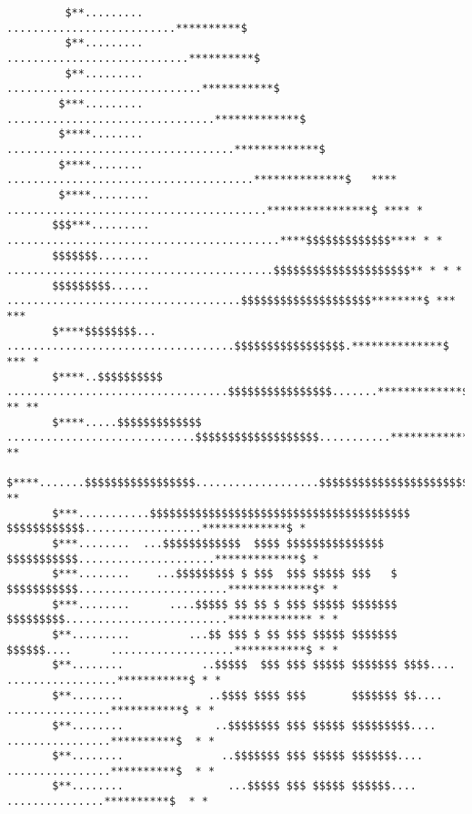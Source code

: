 \begin{verbatim}
         $**.........                                             ..........................**********$
         $**.........                                           ............................**********$
         $**.........                                         ..............................***********$
        $***.........                                      ................................*************$
        $****........                                   ...................................*************$
        $****........                                ......................................**************$   ****
        $****.........                            ........................................****************$ **** *
       $$$***.........                          ..........................................****$$$$$$$$$$$$$**** * *
       $$$$$$$........                        .........................................$$$$$$$$$$$$$$$$$$$$$** * * *
       $$$$$$$$$......                     ....................................$$$$$$$$$$$$$$$$$$$$********$ *** ***
       $****$$$$$$$$...                 ...................................$$$$$$$$$$$$$$$$$.**************$ *** *
       $****..$$$$$$$$$$             ..................................$$$$$$$$$$$$$$$$.......*************$ ** **
       $****.....$$$$$$$$$$$$$     .............................$$$$$$$$$$$$$$$$$$$...........**************$ **
       $****.......$$$$$$$$$$$$$$$$$...................$$$$$$$$$$$$$$$$$$$$$$$$...............**************$ **
       $***...........$$$$$$$$$$$$$$$$$$$$$$$$$$$$$$$$$$$$$$$$   $$$$$$$$$$$$..................*************$ *
       $***........  ...$$$$$$$$$$$$  $$$$ $$$$$$$$$$$$$$$     $$$$$$$$$$$.....................*************$ *
       $***........    ...$$$$$$$$$ $ $$$  $$$ $$$$$ $$$   $ $$$$$$$$$$$.......................*************$* *
       $***........      ....$$$$$ $$ $$ $ $$$ $$$$$ $$$$$$$ $$$$$$$$$.........................************* * *
       $**.........         ...$$ $$$ $ $$ $$$ $$$$$ $$$$$$$ $$$$$$....      ...................***********$ * *
       $**........            ..$$$$$  $$$ $$$ $$$$$ $$$$$$$ $$$$....          .................***********$ * *
       $**........             ..$$$$ $$$$ $$$       $$$$$$$ $$....             ................***********$ * *
       $**........              ..$$$$$$$$ $$$ $$$$$ $$$$$$$$$....              ................**********$  * *
       $**........               ..$$$$$$$ $$$ $$$$$ $$$$$$$....                ................**********$  * *
       $**........                ...$$$$$ $$$ $$$$$ $$$$$$....                  ...............**********$  * *

\end{verbatim}
